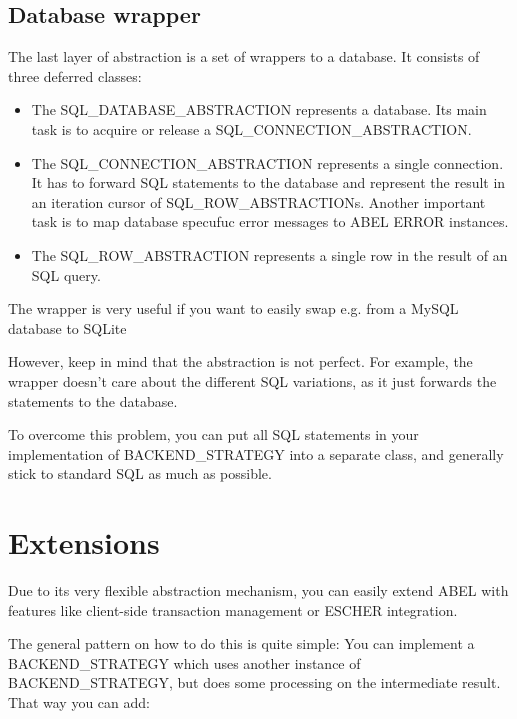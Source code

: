 \subsection{Database wrapper}


The last layer of abstraction is a set of wrappers to a database. 
It consists of three deferred classes: 
\begin{itemize}
 \item The SQL\_DATABASE\_ABSTRACTION represents a database. Its main task is to acquire or release a SQL\_CONNECTION\_ABSTRACTION.
 \item The SQL\_CONNECTION\_ABSTRACTION represents a single connection. 
It has to forward SQL statements to the database and represent the result in an iteration cursor of SQL\_ROW\_ABSTRACTIONs.
Another important task is to map database specufuc error messages to ABEL ERROR instances.
  \item The SQL\_ROW\_ABSTRACTION represents a single row in the result of an SQL query.
\end{itemize}

The wrapper is very useful if you want to easily swap e.g. from a MySQL database to SQLite

However, keep in mind that the abstraction is not perfect. 
For example, the wrapper doesn't care about the different SQL variations, as it just forwards the statements to the database.

To overcome this problem, you can put all SQL statements in your implementation of BACKEND\_STRATEGY into a separate class, and generally stick to standard SQL as much as possible.


\section{Extensions}

Due to its very flexible abstraction mechanism, you can easily extend ABEL with features like client-side transaction management or ESCHER  integration.

The general pattern on how to do this is quite simple: 
You can implement a BACKEND\_STRATEGY which uses another instance of BACKEND\_STRATEGY, but does some processing on the intermediate result.
That way you can add:


